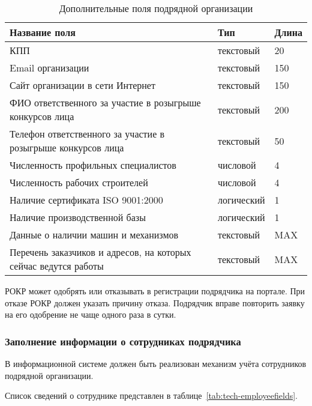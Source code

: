 \begin{footnotesize}
\begin{longtable}[h]{|p{}|p{}|p{}|}
	\caption{\label{tab:tech-orgaddfields}Дополнительные поля подрядной организации} \\
	\hline
		\textbf{Название поля} & \textbf{Тип} & \textbf{Длина} \\
	\hline \endhead
		КПП & текстовый & 20 \\
	\hline
		Email организации & текстовый & 150 \\
	\hline
		Сайт организации в сети Интернет & текстовый & 150 \\
	\hline
		ФИО ответственного за участие в розыгрыше конкурсов лица & текстовый & 200 \\
	\hline
		Телефон ответственного за участие в розыгрыше конкурсов лица & текстовый & 50 \\
	\hline
		Численность профильных специалистов & числовой & 4 \\
	\hline
		Численность рабочих строителей & числовой & 4 \\
	\hline
		Наличие сертификата ISO 9001:2000 & логический & 1 \\
	\hline
		Наличие производственной базы & логический & 1 \\
	\hline
		Данные о наличии машин и механизмов & текстовый & MAX \\
	\hline
		Перечень заказчиков и адресов, на которых сейчас ведутся работы & текстовый & MAX \\
	\hline
\end{longtable}
\end{footnotesize}

РОКР может одобрять или отказывать в регистрации подрядчика на портале.
При отказе РОКР должен указать причину отказа.
Подрядчик вправе повторить заявку на его одобрение не чаще одного раза в сутки.

\subsubsection{Заполнение информации о сотрудниках подрядчика}

В информационной системе должен быть реализован механизм учёта сотрудников подрядной организации.

Список сведений о сотруднике представлен в таблице~\ref{tab:tech-employeefields}.

